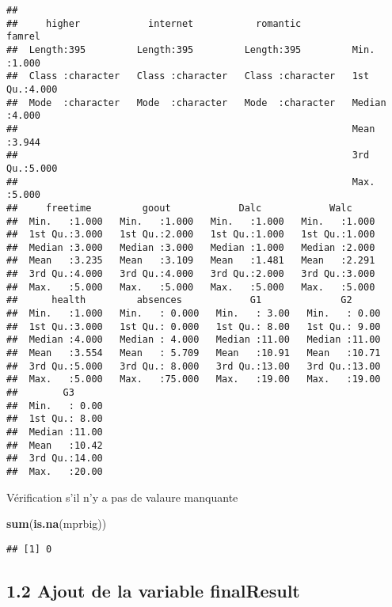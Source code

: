 \documentclass[
]{article}
\newenvironment{Shaded}{\begin{snugshade}}{\end{snugshade}}
\newcommand{\KeywordTok}[1]{\textcolor[rgb]{0.13,0.29,0.53}{\textbf{#1}}}
\newcommand{\NormalTok}[1]{#1}
\begin{document}
\begin{verbatim}
##                                                                             
##     higher            internet           romantic             famrel     
##  Length:395         Length:395         Length:395         Min.   :1.000  
##  Class :character   Class :character   Class :character   1st Qu.:4.000  
##  Mode  :character   Mode  :character   Mode  :character   Median :4.000  
##                                                           Mean   :3.944  
##                                                           3rd Qu.:5.000  
##                                                           Max.   :5.000  
##     freetime         goout            Dalc            Walc      
##  Min.   :1.000   Min.   :1.000   Min.   :1.000   Min.   :1.000  
##  1st Qu.:3.000   1st Qu.:2.000   1st Qu.:1.000   1st Qu.:1.000  
##  Median :3.000   Median :3.000   Median :1.000   Median :2.000  
##  Mean   :3.235   Mean   :3.109   Mean   :1.481   Mean   :2.291  
##  3rd Qu.:4.000   3rd Qu.:4.000   3rd Qu.:2.000   3rd Qu.:3.000  
##  Max.   :5.000   Max.   :5.000   Max.   :5.000   Max.   :5.000  
##      health         absences            G1              G2       
##  Min.   :1.000   Min.   : 0.000   Min.   : 3.00   Min.   : 0.00  
##  1st Qu.:3.000   1st Qu.: 0.000   1st Qu.: 8.00   1st Qu.: 9.00  
##  Median :4.000   Median : 4.000   Median :11.00   Median :11.00  
##  Mean   :3.554   Mean   : 5.709   Mean   :10.91   Mean   :10.71  
##  3rd Qu.:5.000   3rd Qu.: 8.000   3rd Qu.:13.00   3rd Qu.:13.00  
##  Max.   :5.000   Max.   :75.000   Max.   :19.00   Max.   :19.00  
##        G3       
##  Min.   : 0.00  
##  1st Qu.: 8.00  
##  Median :11.00  
##  Mean   :10.42  
##  3rd Qu.:14.00  
##  Max.   :20.00
\end{verbatim}

Vérification s'il n'y a pas de valaure manquante

\begin{Shaded}
\begin{Highlighting}[]
\KeywordTok{sum}\NormalTok{(}\KeywordTok{is.na}\NormalTok{(mprbig))}
\end{Highlighting}
\end{Shaded}

\begin{verbatim}
## [1] 0
\end{verbatim}

\hypertarget{ajout-de-la-variable-finalresult}{%
\subsection{1.2 Ajout de la variable
finalResult}\label{ajout-de-la-variable-finalresult}}
\end{document}
